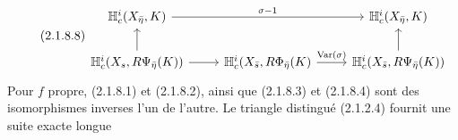 \begin{equation}\tag{2.1.8.8}
\begin{tikzcd}
\mathbb{H}^i_c(X_{\bar{\eta}}, K) \arrow[rr, "\sigma-1"] & & \mathbb{H}^i_c(X_{\bar{\eta}}, K) \\
\mathbb{H}^i_c(X_s, R\Psi_{\bar{\eta}}(K)) \arrow[r] \arrow[u] & \mathbb{H}^i_c(X_{\bar{s}}, R\Phi_{\bar{\eta}}(K) \arrow[r, "\mathrm{Var}(\sigma)"] & \mathbb{H}^i_c(X_{\bar{s}}, R\Psi_{\bar{\eta}}(K)) \arrow[u]
\end{tikzcd}
\end{equation}
Pour $f$ propre, (2.1.8.1) et (2.1.8.2), ainsi que (2.1.8.3) et (2.1.8.4) sont des isomorphismes inverses l'un de l'autre. Le triangle distingué (2.1.2.4) fournit une suite exacte longue

